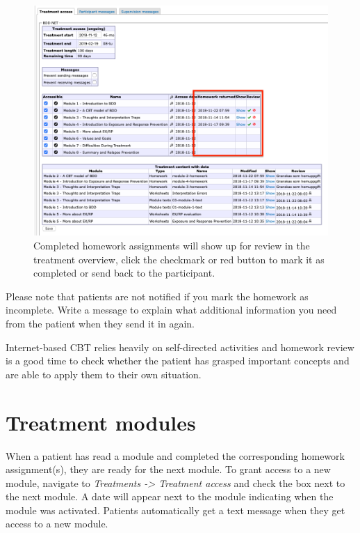\documentclass[]{book}
\theoremstyle{definition}
\theoremstyle{definition}
\theoremstyle{definition}
\theoremstyle{remark}
\begin{document}
\begin{figure}
\centering
\includegraphics{images/homework-complete.png}
\caption{Completed homework assignments will show up for review in the
treatment overview, click the checkmark or red button to mark it as
completed or send back to the participant.}
\end{figure}

Please note that patients are not notified if you mark the homework as
incomplete. Write a message to explain what additional information you
need from the patient when they send it in again.

Internet-based CBT relies heavily on self-directed activities and
homework review is a good time to check whether the patient has grasped
important concepts and are able to apply them to their own situation.

\hypertarget{treatment-modules}{%
\section{Treatment modules}\label{treatment-modules}}

When a patient has read a module and completed the corresponding
homework assignment(s), they are ready for the next module. To grant
access to a new module, navigate to \emph{Treatments -\textgreater{}
Treatment access} and check the box next to the next module. A date will
appear next to the module indicating when the module was activated.
Patients automatically get a text message when they get access to a new
module.
\end{document}
